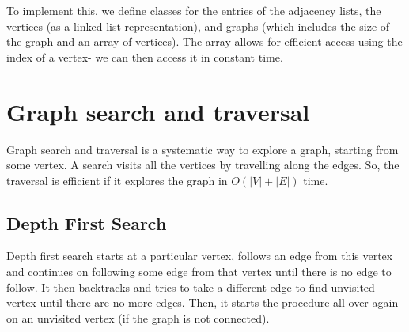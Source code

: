 \documentclass[a4paper, openany]{memoir}
\begin{document}
To implement this, we define classes for the entries of the adjacency lists, the vertices (as a linked list representation), and graphs (which includes the size of the graph and an array of vertices). The array allows for efficient access using the index of a vertex- we can then access it in constant time.

% 
\newpage

\section{Graph search and traversal}
Graph search and traversal is a systematic way to explore a graph, starting from some vertex. A search visits all the vertices by travelling along the edges. So, the traversal is efficient if it explores the graph in $O(|V| + |E|)$ time.

\subsection{Depth First Search}
Depth first search starts at a particular vertex, follows an edge from this vertex and continues on following some edge from that vertex until there is no edge to follow. It then backtracks and tries to take a different edge to find unvisited vertex until there are no more edges. Then, it starts the procedure all over again on an unvisited vertex (if the graph is not connected).
\end{document}
